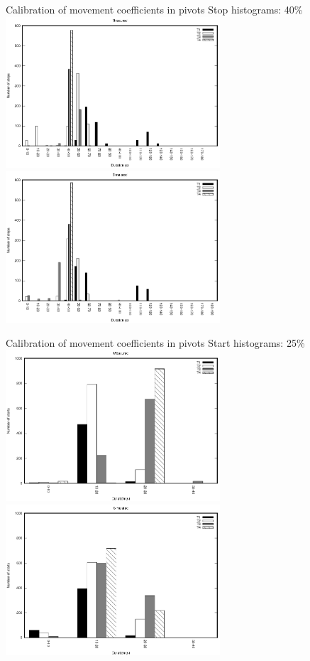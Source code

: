 \documentclass[10pt]{beamer}
\begin{document}
\begin{frame}{Calibration of movement coefficients in pivots}
{Stop histograms: 40\%}
	\includegraphics[width=0.60\textwidth]{pivot-measured-stops-40.eps}\\
	\includegraphics[width=0.60\textwidth]{pivot-simulated-stops-40.eps}
\end{frame}

\begin{frame}{Calibration of movement coefficients in pivots}
{Start histograms: 25\%}
	\includegraphics[width=0.60\textwidth]{pivot-measured-starts-25.eps}\\
	\includegraphics[width=0.60\textwidth]{pivot-simulated-starts-25.eps}
\end{frame}
\end{document}
